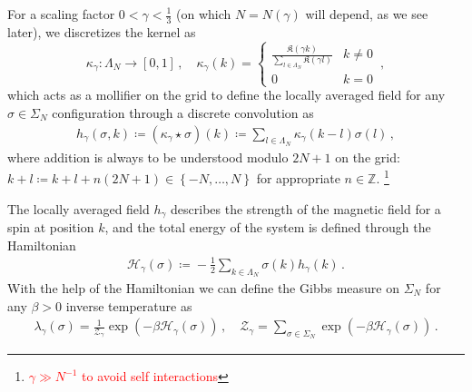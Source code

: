 \documentclass{report}
\newcommand{\ZZ}{\mathbb{Z}}
\newcommand{\Convolve}[3][]{#2 \star_{#1} #3}
\DeclareMathOperator{\DefiningEquality}{\coloneqq}
\theoremstyle{remark}
\theoremstyle{definition}
\begin{document}
For a scaling factor $0 < \gamma < \frac{1}{3}$ (on which $N = N(\gamma)$ will depend, as we see later), we discretizes the kernel as 
$$\kappa_\gamma: \Lambda_N \to [0, 1]\,,\quad\kappa_\gamma(k) = \begin{cases}
  \frac{\mathfrak{K}(\gamma k)}{\sum_{l \in \Lambda_N} \mathfrak{K}(\gamma l)}&k \neq 0\\
  0 & k = 0
\end{cases}\,,$$
which acts as a mollifier on the grid to define the locally averaged field for any $\sigma \in \Sigma_N$ configuration through a discrete convolution as \begin{align}
  h_\gamma(\sigma, k) \DefiningEquality (\Convolve{\kappa_\gamma}{\sigma})(k) \DefiningEquality  \sum_{l\in \Lambda_N} \kappa_\gamma(k-l) \sigma(l)\,,
\end{align}
where addition is always to be understood modulo $2N + 1$ on the grid: $k + l \DefiningEquality k + l + n(2N + 1) \in \left\{-N, \ldots, N\right\}$ for appropriate $n \in \ZZ$. \footnote{\textcolor{red}{$\gamma \gg N^{-1}$ to avoid self interactions}}

The locally averaged field $h_\gamma$ describes the strength of the magnetic field for a spin at position $k$, and the total energy of the system is defined through the Hamiltonian \begin{align}
  \mathcal{H}_\gamma(\sigma) \DefiningEquality -\frac{1}{2}\sum_{k\in \Lambda_N} \sigma(k) h_\gamma(k)\,.
\end{align} With the help of the Hamiltonian we can define the Gibbs measure on $\Sigma_N$ for any $\beta > 0$ inverse temperature as \begin{align}
  \lambda_\gamma(\sigma) = \frac{1}{\mathcal{Z}_\gamma}\exp{\left(-\beta \mathcal{H}_\gamma(\sigma)\right)}\,,\quad \mathcal{Z}_\gamma = \sum_{\sigma \in \Sigma_N} \exp{\left(-\beta \mathcal{H}_\gamma(\sigma)\right)}\,.
\end{align}
\end{document}
